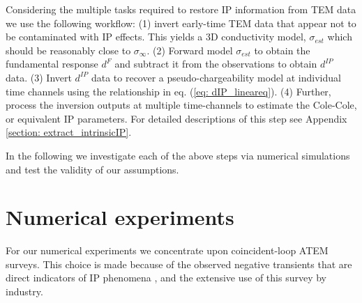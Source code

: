 \documentclass[extra,mreferee]{gji}
\newcommand{\siginf}{\sigma_\infty}
\newcommand{\dip}{d^{IP}}
\begin{document}
Considering the multiple tasks required to restore IP information from TEM data we use the following workflow:  (1) invert early-time TEM data that appear not to be contaminated with IP effects. This yields a 3D conductivity model, $\sigma_{est}$ which should be reasonably close to $\siginf$.
(2) Forward model $\sigma_{est}$ to obtain the fundamental response $d^F$ and subtract it from the observations to obtain $\dip$ data.
(3) Invert  $\dip$ data to recover a pseudo-chargeability model at individual time channels using the relationship in eq. (\ref{eq: dIP_lineareq}).
(4) Further, process the inversion outputs at multiple time-channels  to estimate the Cole-Cole, or equivalent IP parameters. For detailed descriptions of this step see Appendix \ref{section: extract_intrinsicIP}.

In the following we investigate each of the above steps via numerical simulations and test the validity of our assumptions.


\section{Numerical experiments}
\label{section: numerical_examples}
For our numerical experiments we concentrate upon coincident-loop ATEM surveys. This choice is made because of the observed negative transients that are direct indicators of IP phenomena \cite[]{SmithandKlein,Kratzer2012,Kang2015a}, and the extensive use of this survey by industry.
\end{document}
